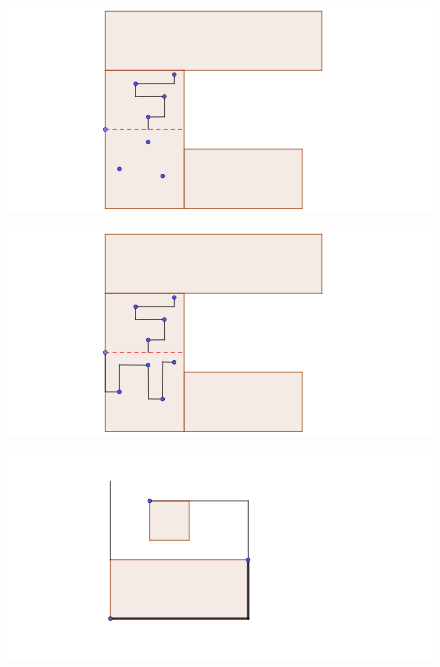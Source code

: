 \documentclass{beamer}
\begin{document}
\begin{frame}
\begin{figure}[h]
\includegraphics[width=\textwidth]{Nuestra-construccion-3}
\end{figure}
\end{frame}
\begin{frame}
\begin{figure}[h]
\includegraphics[width=\textwidth]{Nuestra-construccion-4}
\end{figure}
\end{frame}
\begin{frame}
\begin{figure}[h]
\includegraphics[width=\textwidth]{Cajas-2-puntos}
\end{figure}
\end{frame}
\end{document}
